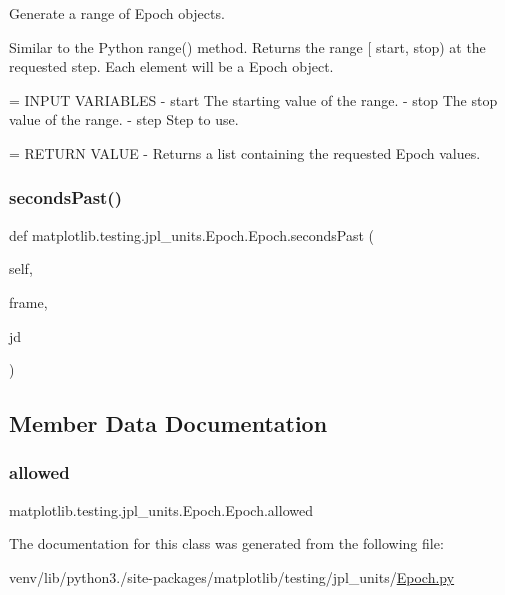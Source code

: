 \begin{DoxyVerb}Generate a range of Epoch objects.

Similar to the Python range() method.  Returns the range [
start, stop) at the requested step.  Each element will be a
Epoch object.

= INPUT VARIABLES
- start     The starting value of the range.
- stop      The stop value of the range.
- step      Step to use.

= RETURN VALUE
- Returns a list containing the requested Epoch values.
\end{DoxyVerb}
 \mbox{\label{classmatplotlib_1_1testing_1_1jpl__units_1_1Epoch_1_1Epoch_a23a8ba29cb0162aad9c7b019cc66fa7d}} 
\subsubsection{\texorpdfstring{seconds\+Past()}{secondsPast()}}
{\footnotesize\ttfamily def matplotlib.\+testing.\+jpl\+\_\+units.\+Epoch.\+Epoch.\+seconds\+Past (\begin{DoxyParamCaption}\item[{}]{self,  }\item[{}]{frame,  }\item[{}]{jd }\end{DoxyParamCaption})}



\subsection{Member Data Documentation}
\mbox{\label{classmatplotlib_1_1testing_1_1jpl__units_1_1Epoch_1_1Epoch_a5dee9539942601cac70651c09373e136}} 
\subsubsection{\texorpdfstring{allowed}{allowed}}
{\footnotesize\ttfamily matplotlib.\+testing.\+jpl\+\_\+units.\+Epoch.\+Epoch.\+allowed\hspace{0.3cm}{\ttfamily [static]}}



The documentation for this class was generated from the following file\+:\begin{DoxyCompactItemize}
\item 
venv/lib/python3./site-\/packages/matplotlib/testing/jpl\+\_\+units/\hyperlink{Epoch_8py}{Epoch.\+py}\end{DoxyCompactItemize}
